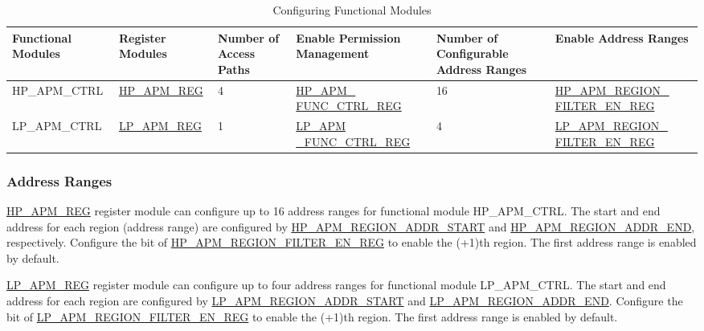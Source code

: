 \documentclass[main\_\_EN.tex]{subfiles}
\begin{document}
\begin{footnotesize}
\begin{longtable}[C]{|L{2cm}|L{2.5cm}|L{2cm}|L{3cm}|L{2.5cm}|L{2.5cm}|}
    \caption{Configuring Functional  Modules}
    \label{tab:apm-reg}\\\hline
    \textbf{Functional  Modules} & \textbf{Register Modules} & \textbf{Number of Access Paths} & \textbf{Enable Permission Management} & \textbf{Number of Configurable Address Ranges} & \textbf{Enable Address Ranges}\\ \hline
    \endfirsthead
    \endlastfoot

   HP\_APM\_CTRL & \hyperref[sec:permctrl-reg-hp]{HP\_APM\_REG} &  4 &\hyperref[regdesc:HPAPMFUNCCTRLREG]{HP\_APM\_ FUNC\_CTRL\_REG} & 16 & \hyperref[fielddesc:HPAPMREGIONFILTEREN]{HP\_APM\_REGION\_ FILTER\_EN\_REG}\\ \hline

   LP\_APM\_CTRL & \hyperref[sec:permctrl-reg-lp]{LP\_APM\_REG} &  1 & \hyperref[regdesc:LPAPMFUNCCTRLREG]{LP\_APM \_FUNC\_CTRL\_REG} & 4 & \hyperref[fielddesc:LPAPMREGIONFILTEREN]{LP\_APM\_REGION\_ FILTER\_EN\_REG}\\ \hline

\end{longtable}
\end{footnotesize}

\subsubsection{Address Ranges}

\hyperref[sec:permctrl-reg-hp]{HP\_APM\_REG} register module can configure up to 16 address ranges for functional module HP\_APM\_CTRL. The start and end address for each region (address range) are configured by  \hyperref[regdesc:HPAPMREGION0ADDRSTARTREG]{HP\_APM\_REGION\_ADDR\_START} and \hyperref[regdesc:HPAPMREGION0ADDRENDREG]{HP\_APM\_REGION\_ADDR\_END}, respectively. Configure the bit  of \hyperref[fielddesc:HPAPMREGIONFILTEREN]{HP\_APM\_REGION\_FILTER\_EN\_REG} to enable the (+1)th region. The first address range is enabled by default.

\hyperref[sec:permctrl-reg-lp]{LP\_APM\_REG} register module can configure up to four address ranges for functional module LP\_APM\_CTRL. The start and end address for each region are configured by \hyperref[fielddesc:LPAPMREGION0ADDRSTART]{LP\_APM\_REGION\_ADDR\_START} and \hyperref[fielddesc:LPAPMREGION0ADDREND]{LP\_APM\_REGION\_ADDR\_END}. Configure the bit  of \hyperref[fielddesc:LPAPMREGIONFILTEREN]{LP\_APM\_REGION\_FILTER\_EN\_REG} to enable the (+1)th region. The first address range is enabled by default.
\end{document}
